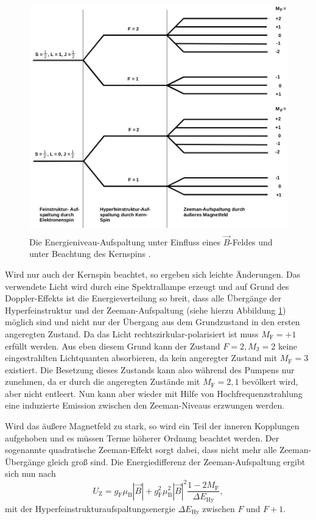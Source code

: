\begin{figure}
  \centering
  \includegraphics[height=10cm]{content/pictures/Energieniveaus2.png}
  \caption{Die Energieniveau-Aufspaltung unter Einfluss eines $\vec{B}$-Feldes und unter Beachtung des Kernspins \cite{anleitung}.}
  \label{fig:aufspaltung2}
\end{figure}
Wird nur auch der Kernspin beachtet, so ergeben sich leichte Änderungen. Das verwendete Licht wird durch eine Spektrallampe erzeugt und 
auf Grund des Doppler-Effekts ist die Energieverteilung so breit, dass alle Übergänge der 
Hyperfeinstruktur und der Zeeman-Aufspaltung (siehe hierzu Abbildung \ref{fig:aufspaltung2}) möglich sind und nicht nur der Übergang aus
dem Grundzustand in den ersten angeregten Zustand. Da das Licht rechtszirkular-polarisiert ist
muss $M_\text{F} = +1$ erfüllt werden. Aus eben diesem Grund kann der Zustand $F = 2, M_\text{J} = 2$ keine
eingestrahlten Lichtquanten absorbieren, da kein angeregter Zustand mit $M_\text{F} = 3$ existiert. Die Besetzung dieses Zustands
kann also während des Pumpens nur zunehmen, da er durch die angeregten Zustände mit $M_\text{F} = 2, 1$ bevölkert wird, aber nicht entleert.
Nun kann aber wieder mit Hilfe von Hochfrequenzstrahlung eine induzierte Emission zwischen den Zeeman-Niveaus erzwungen werden.

Wird das äußere Magnetfeld zu stark, so wird ein Teil der inneren Kopplungen aufgehoben und 
es müssen Terme höherer Ordnung beachtet werden. Der sogenannte quadratische Zeeman-Effekt sorgt dabei, dass nicht mehr alle 
Zeeman-Übergänge gleich groß sind. Die Energiedifferenz der Zeeman-Aufspaltung ergibt sich nun nach
\begin{equation}
  \label{eqn:zeemanquadrat}
  U_\text{Z} = g_\text{F} \mu_\text{B} |\vec{B}| + g_\text{F}^2 \mu_\text{B}^2 |\vec{B}|^2 \frac{1-2 M_\text{F}}{\Delta E_\text{Hy}},
\end{equation}
mit der Hyperfeinstrukturaufspaltungsenergie $\Delta E_\text{Hy}$ zwischen $F$ und $F+1$.

